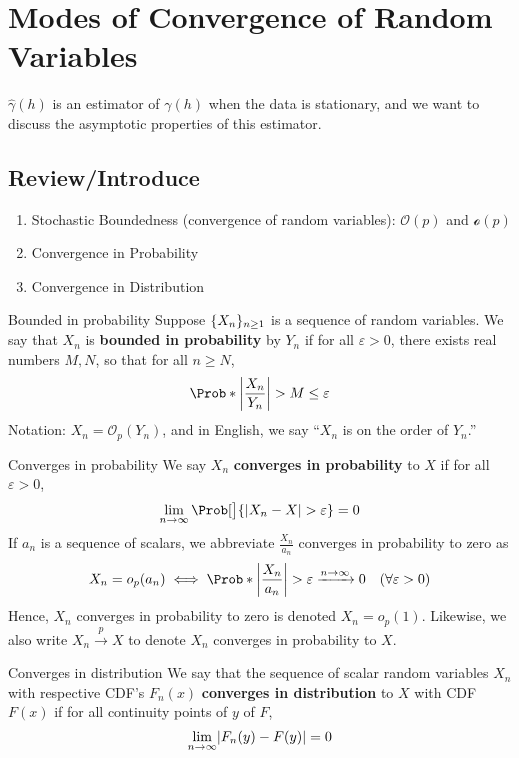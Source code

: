 \section{Modes of Convergence of Random Variables}
$ \hat{\gamma}(h) $ is an estimator of $ \gamma(h) $ when the data is stationary,
and we want to discuss the asymptotic properties of this estimator.

\subsection*{Review/Introduce}
\begin{enumerate}[(1)]
    \item Stochastic Boundedness (convergence of random variables): $ \mathcal{O}(p) $
          and $ \mathcal{o}(p) $
    \item Convergence in Probability
    \item Convergence in Distribution
\end{enumerate}
\begin{Definition}{Bounded in probability}{}
    Suppose $ \{X_n\}_{n\ge 1} $ is a sequence of random variables.
    We say that $ X_n $ is \textbf{bounded in probability}
    by $ Y_n $ if for all $ \varepsilon>0 $, there exists real numbers
    $ M,N $, so that for all $ n\ge N $,
    \[ \Prob*{\abs*{\frac{X_n}{Y_n}}> M}\le \varepsilon
    \]
    Notation: $ X_n=\mathcal{O}_p(Y_n) $, and in English, we say
    ``$ X_n $ is on the order of $ Y_n $.''
\end{Definition}
\begin{Definition}{Converges in probability}{}
    We say $ X_n $ \textbf{converges in probability}
    to $ X $ if for all $ \varepsilon>0 $,
    \[ \lim\limits_{{n} \to {\infty}} \Prob[\big]{\abs{X_n-X}>\varepsilon}=0 \]
    If $ a_n $ is a sequence of scalars, we abbreviate
    $ \displaystyle \frac{X_n}{a_n} $
    converges in probability to zero as
    \[ X_n=o_p(a_n)\iff \Prob*{\abs*{\frac{X_n}{a_n}}>\varepsilon}\xrightarrow{n\to\infty}0
        \quad (\forall\varepsilon>0) \]
    Hence, $ X_n $
    converges in probability to zero is denoted $ X_n=o_p(1) $.
    Likewise, we also write $ X_n\stackrel{p}{\to}X $ to denote $ X_n $
    converges in probability to $ X $.
\end{Definition}
\begin{Definition}{Converges in distribution}{}
    We say that the sequence of scalar random variables
    $ X_n $ with respective CDF's $ F_n(x) $
    \textbf{converges in distribution} to $ X $ with CDF $ F(x) $
    if for all continuity points of $ y $ of $ F $,
    \[ \lim\limits_{{n} \to {\infty}} \lvert F_n(y)-F(y)\rvert=0 \]
\end{Definition}
